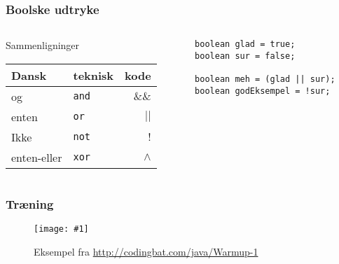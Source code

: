 \documentclass{beamer}
\newcommand{\FIG}[2]{
  \begin{figure}[]
    \centering
    \texttt{[image: \#1]}
    \caption{#2}
    \label{fig:#1}
  \end{figure}
}
\begin{document}
\begin{frame}[fragile]
  \frametitle{Boolske udtryke}
  \begin{columns}
    \begin{column}{0.5\textwidth}
      \begin{block}{Sammenligninger}
        \begin{table}[h]
          \centering
          \begin{tabular}{llr}
            Dansk & teknisk & kode \\
            \hline
            og & \texttt{and} & $\&\&$ \\
            enten & \texttt{or} & $|| $\\
            Ikke & \texttt{not} & $!$\\
            enten-eller & \texttt{xor} & $\wedge$\\
          \end{tabular}
        \end{table}
      \end{block}
    \end{column}
    \begin{column}{0.5\textwidth}
\begin{verbatim} 
boolean glad = true;
boolean sur = false;

boolean meh = (glad || sur);
boolean godEksempel = !sur;

\end{verbatim}
    \end{column}
  \end{columns}
\end{frame}



\begin{frame}
  \frametitle{Træning}

  \FIG{codingbat}{Eksempel fra \url{http://codingbat.com/java/Warmup-1}}

\end{frame}
\end{document}
